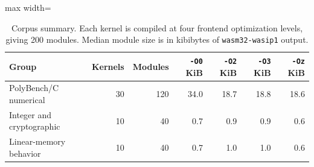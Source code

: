 \begin{table}[t]
\caption{Corpus summary. Each kernel is compiled at four frontend optimization levels, giving 200 modules. Median module size is in kibibytes of \texttt{wasm32-wasip1} output.}\label{tab:corpus}
\footnotesize
\setlength{\tabcolsep}{5pt}%
\begin{adjustbox}{max width=\textwidth}%
\begin{tabular}{lrrrrrr}
\toprule
Group & Kernels & Modules & \texttt{-O0} KiB & \texttt{-O2} KiB & \texttt{-O3} KiB & \texttt{-Oz} KiB \\
\midrule
PolyBench/C numerical & 30 & 120 & 34.0 & 18.7 & 18.8 & 18.6 \\
Integer and cryptographic & 10 & 40 & 0.7 & 0.9 & 0.9 & 0.6 \\
Linear-memory behavior & 10 & 40 & 0.7 & 1.0 & 1.0 & 0.6 \\
\bottomrule
\end{tabular}%
\end{adjustbox}
\end{table}
